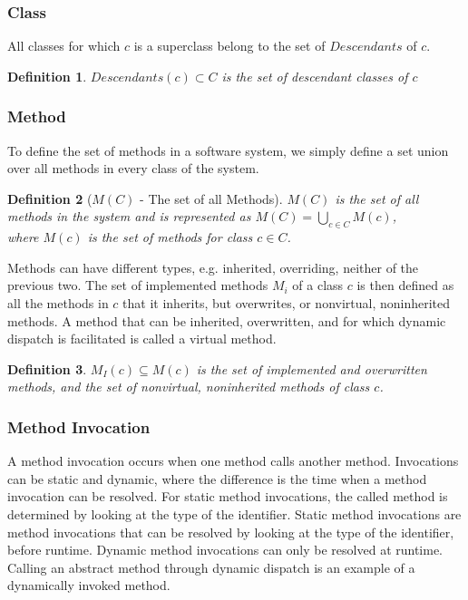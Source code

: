 \documentclass{uvamscse}
\newtheorem{definition}{Definition}[section]
\begin{document}
\subsubsection{Class}
All classes for which $c$ is a superclass belong to the set of $Descendants$ of $c$.

\begin{definition}
	$Descendants(c) \subset C$ is the set of descendant classes of $c$
\end{definition}

\subsubsection{Method}
To define the set of methods in a software system, we simply define a set union over all methods in every class of the system.


	\begin{definition}[$M(C)$ - The set of all Methods] $M(C)$ is the set of all methods in the system and is represented as $M(C) = \bigcup\limits_{c \in C} M(c)$, \\
		
	where $M(c)$ is the set of methods for class $c \in C$.
	\cite{briand1999unified}
	\end{definition}

Methods can have different types, e.g. inherited, overriding, neither of the previous two. The set of implemented methods $M_i$ of a class $c$ is then defined as all the methods in $c$ that it inherits, but overwrites, or nonvirtual, noninherited methods. A method that can be inherited, overwritten, and for which dynamic dispatch is facilitated is called a virtual method. 

\begin{definition}
	$M_I(c) \subseteq M(c)$ is the set of implemented and overwritten methods, and the set of nonvirtual, noninherited methods of class $c$.
\end{definition}

\subsubsection{Method Invocation}
A method invocation occurs when one method calls another method. Invocations can be static and dynamic, where the difference is the time when a method invocation can be resolved. For static method invocations, the called method is determined by looking at the type of the identifier. Static method invocations are method invocations that can be resolved by looking at the type of the identifier, before runtime. Dynamic method invocations can only be resolved at runtime. Calling an abstract method through dynamic dispatch is an example of a dynamically invoked method. 
\end{document}
